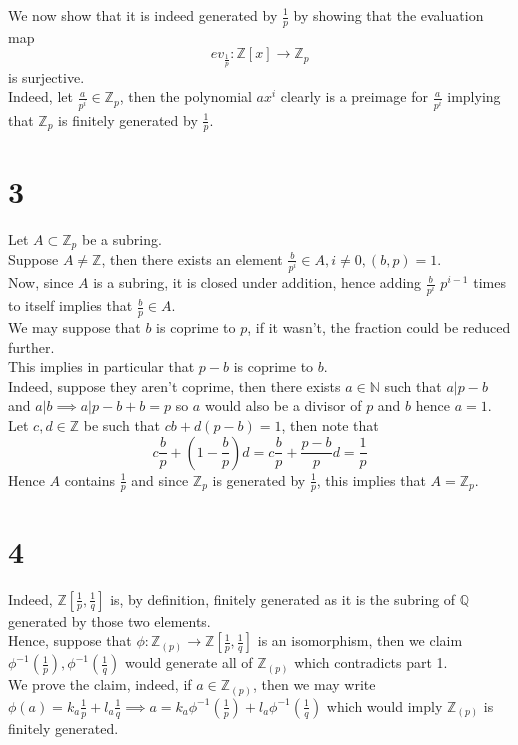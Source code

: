 \documentclass[11pt, a4paper]{article}
\begin{document}
We now show that it is indeed generated by $ \frac{1}{p}$ by showing that the evaluation map
\[ 
	ev_{\frac{1}{p}} : \mathbb{Z}[x ] \to \mathbb{Z}_p
\]
is surjective.\\
Indeed, let $ \frac{a}{p^{i}}\in \mathbb{Z}_{p}$, then the polynomial $ a x^{i}$ clearly is a preimage for $ \frac{a}{p^{i}}$ implying that $ \mathbb{Z}_p$ is finitely generated by $ \frac{1}{p}$.
\section*{3}
Let $ A \subset \mathbb{Z}_p$ be a subring.\\
Suppose $ A \neq \mathbb{Z}$, then there exists an element $ \frac{b}{p^{i}}\in A, i \neq 0, ( b,p) =1$.\\
Now, since $A$ is a subring, it is closed under addition, hence adding $ \frac{b}{p^{i}}$ $ p^{i-1}$ times to itself implies that $ \frac{b}{p}\in A$.\\
We may suppose that $b$ is coprime to $p$, if it wasn't, the fraction could be reduced further.\\
This implies in particular that $ p-b$ is coprime to $b$.\\
Indeed, suppose they aren't coprime, then there exists $a\in \mathbb{N}$ such that $a| p-b$ and $a|b\implies a|p-b+b = p$ so $a$ would also be a divisor of $p$ and $b$ hence $a=1$.\\
Let $c,d\in \mathbb{Z}$ be such that $ cb + d ( p-b) = 1$, then note that
\[ 
c \frac{b}{p} + ( 1- \frac{b}{p}) d = c \frac{b}{p} + \frac{p-b}{p}d = \frac{1}{p}
\]
Hence $ A$ contains $ \frac{1}{p}$ and since $ \mathbb{Z}_p$ is generated by $ \frac{1}{p}$, this implies that $ A = \mathbb{Z}_p$.
\section*{4}
Indeed, $ \mathbb{Z}\left[\frac{1}{p}, \frac{1}{q}\right]$ is, by definition, finitely generated as it is the subring of $ \mathbb{Q}$ generated by those two elements.\\
Hence, suppose that $ \phi:\mathbb{Z}_{ ( p) }\to \mathbb{Z} \left[ \frac{1}{p}, \frac{1}{q}\right] $ is an isomorphism, then we claim $ \phi^{-1}( \frac{1}{p}), \phi^{-1}( \frac{1}{q})  $ would generate all of $ \mathbb{Z}_{ ( p) } $ which contradicts part 1.\\
We prove the claim, indeed, if $ a \in \mathbb{Z}_{( p) } $, then we may write $ \phi( a) = k_a \frac{1}{p} + l_a \frac{1}{q}\implies a = k_a \phi^{-1}( \frac{1}{p}) + l_a \phi^{-1}( \frac{1}{q}) $ which would imply $\mathbb{Z}_{ ( p) } $ is finitely generated.
\end{document}
